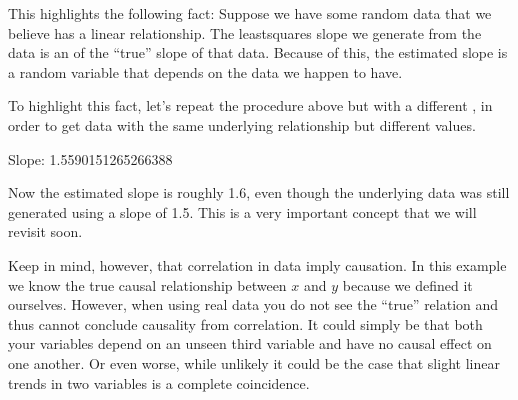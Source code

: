 \documentclass[letterpaper,10pt,english]{jupyterBook}
\begin{document}
\sphinxAtStartPar
This highlights the following fact: Suppose we have some random data that we believe has a linear relationship. The least\sphinxhyphen{}squares slope we generate from the data is an  of the “true” slope of that data. Because of this, the estimated slope is a random variable that depends on the data we happen to have.

\sphinxAtStartPar
To highlight this fact, let’s repeat the procedure above but with a different , in order to get data with the same underlying relationship but different values.

\begin{sphinxVerbatim}[commandchars=\\\{\}]
    
    
      

   
      
      
\end{sphinxVerbatim}

\begin{sphinxVerbatim}[commandchars=\\\{\}]
Slope:  1.5590151265266388
\end{sphinxVerbatim}

\noindent{}

\sphinxAtStartPar
Now the estimated slope is roughly 1.6, even though the underlying data was still generated using a slope of 1.5. This is a very important concept that we will revisit soon.

\sphinxAtStartPar
Keep in mind, however, that correlation in data  imply causation. In this example we know the true causal relationship between \(x\) and \(y\) because we defined it ourselves. However, when using real data you do not see the “true” relation and thus cannot conclude causality from correlation. It could simply be that both your variables depend on an unseen third variable and have no causal effect on one another. Or even worse, while unlikely it could be the case that slight linear trends in two variables is a complete coincidence.
\end{document}
